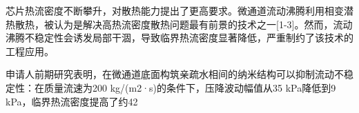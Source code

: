 芯片热流密度不断攀升，对散热能力提出了更高要求。微通道流动沸腾利用相变潜热散热，被认为是解决高热流密度散热问题最有前景的技术之一[1-3]。然而，流动沸腾不稳定性会诱发局部干涸，导致临界热流密度显著降低，严重制约了该技术的工程应用。

申请人前期研究表明，在微通道底面构筑亲疏水相间的纳米结构可以抑制流动不稳定性：在质量流速为200 kg/(m2·s)的条件下，压降波动幅值从35 kPa降低到9 kPa，临界热流密度提高了约42%

